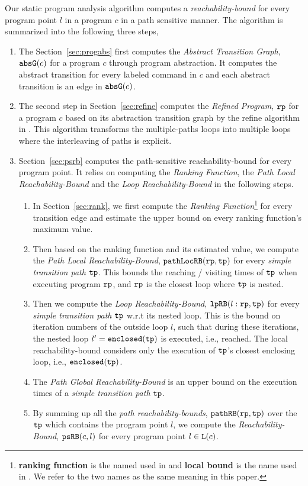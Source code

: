 Our static program analysis algorithm computes 
a \emph{reachability-bound} for every program point $l$ in a program $c$ in a path sensitive manner.
The algorithm is summarized into the following three steps,
\begin{enumerate}
\item  The Section~\ref{sec:progabs} first 
computes the \emph{Abstract Transition Graph}, $\mathtt{abs}{\mathtt{G}}(c)$ for a program $c$ through program abstraction.
It computes the abstract transition 
for every labeled command in $c$ and each abstract transition is an edge in $\mathtt{abs}{\mathtt{G}}(c)$.
\item The second step in Section~\ref{sec:refine}
computes the \emph{Refined Program}, $\mathtt{rp}$ for a program $c$ based on 
its abstraction transition graph by the refine algorithm in \cite{GulwaniJK09}.
This algorithm transforms the multiple-paths loops
into multiple loops where
the interleaving of paths is explicit.
\item Section~\ref{sec:psrb} computes the path-sensitive reachability-bound for every program point.
It relies on computing the \emph{Ranking Function}, the \emph{Path Local Reachability-Bound} and the \emph{Loop Reachability-Bound}  in the following steps.
\begin{enumerate}
    \item In Section~\ref{sec:rank}, we first compute the \emph{Ranking Function}\footnote{\textbf{ranking function} is the named used in \cite{SinnZV14}
    and \textbf{local bound} is the name used in \cite{ZulegerGSV11, SinnZV17}.
    We refer to the two names as the same meaning in this paper.}  for every transition edge 
    and estimate the upper bound on every ranking function's maximum value.
    \item Then based on the ranking function and its estimated value, we compute the \emph{Path Local Reachability-Bound}, $\mathtt{pathLocRB}(\mathtt{rp}, \mathtt{tp})$ for every \emph{simple transition path} $\mathtt{tp}$. 
    This bounds the reaching / visiting times of $\mathtt{tp}$ when executing program $\mathtt{rp}$, and $\mathtt{rp}$ is the closest loop where $\mathtt{tp}$ is nested.
    \item Then we compute the \emph{Loop Reachability-Bound}, $\mathtt{lpRB}(l: \mathtt{rp}, \mathtt{tp})$ for every \emph{simple transition path} $\mathtt{tp}$
    w.r.t its nested loop. 
    This is the bound on iteration numbers of the outside loop $l$,
    such that during these iterations, the nested loop $l' = \mathtt{enclosed(\mathtt{tp})}$ is executed, i.e., reached.
    The local reachability-bound  considers only the execution of $\mathtt{tp}$'s closest enclosing loop, i.e., $\mathtt{enclosed}(\mathtt{tp})$.
    \item The \emph{Path Global Reachability-Bound} is an upper bound on the execution times of a \emph{simple transition path} $\mathtt{tp}$.
    \item By summing up all the \emph{path reachability-bounds}, $\mathtt{pathRB}(\mathtt{rp}, \mathtt{tp})$ over the $\mathtt{tp}$ which contains the program point $l$, we compute the \emph{Reachability-Bound}, $\mathtt{psRB}(c, l)$ for every program point $l \in \mathtt{L}(c)$.
\end{enumerate}
\end{enumerate}